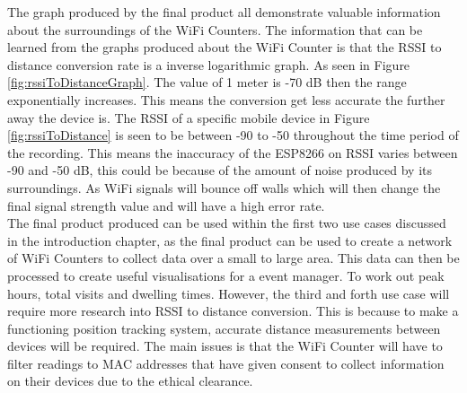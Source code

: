\documentclass{report}
\begin{document}
The graph produced by the final product all demonstrate valuable information about the surroundings of the WiFi Counters. The information that can be learned from the graphs produced about the WiFi Counter is that the RSSI to distance conversion rate is a inverse logarithmic graph. As seen in Figure \ref{fig:rssiToDistanceGraph}. The value of 1 meter is -70 dB then the range exponentially increases. This means the conversion get less accurate the further away the device is. The RSSI of a specific mobile device in Figure \ref{fig:rssiToDistance} is seen to be between -90 to -50 throughout the time period of the recording. This means the inaccuracy of the ESP8266 on RSSI varies between -90 and -50 dB, this could be because of the amount of noise produced by its surroundings. As WiFi signals will bounce off walls which will then change the final signal strength value and will have a high error rate. \\ \newline
The final product produced can be used within the first two use cases discussed in the introduction chapter, as the final product can be used to create a network of WiFi Counters to collect data over a small to large area. This data can then be processed to create useful visualisations for a event manager. To work out peak hours, total visits and dwelling times. However, the third and forth use case will require more research into RSSI to distance conversion.  This is because to make a functioning position tracking system, accurate distance measurements between devices will be required. The main issues is that the WiFi Counter will have to filter readings to MAC addresses that have given consent to collect information on their devices due to the ethical clearance. 
\clearpage
\end{document}

